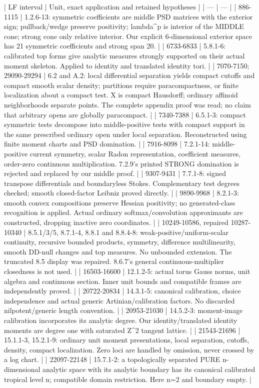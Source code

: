 \documentclass[11pt]{article}
\begin{document}
| LF interval | Unit, exact application and retained hypotheses |
| --- | --- |
| 886-1115 | 1.2.6-13: symmetric coefficients are middle PSD matrices with the exterior sign; pullback/wedge preserve positivity; lambda\textasciicircum{}p is interior of the MIDDLE cone; strong cone only relative interior. Our explicit 6-dimensional exterior space has 21 symmetric coefficients and strong span 20. |
| 6733-6833 | 5.8.1-6: calibrated top forms give analytic measures strongly supported on their actual moment skeleton. Applied to identity and translated identity tori. |
| 7070-7150; 29090-29294 | 6.2 and A.2: local differential separation yields compact cutoffs and compact smooth scalar density; partitions require paracompactness, or finite localization about a compact test. X is compact Hausdorff; ordinary affinoid neighborhoods separate points. The complete appendix proof was read; no claim that arbitrary opens are globally paracompact. |
| 7340-7388 | 6.5.1-3: compact symmetric tests decompose into middle-positive tests with compact support in the same prescribed ordinary open under local separation. Reconstructed using finite moment charts and PSD domination. |
| 7916-8098 | 7.2.1-14: middle-positive current symmetry, scalar Radon representation, coefficient measures, order-zero continuous multiplication. 7.2.9's printed STRONG domination is rejected and replaced by our middle proof. |
| 9307-9431 | 7.7.1-8: signed transpose differentials and boundaryless Stokes. Complementary test degrees checked; smooth closed-factor Leibniz proved directly. |
| 9890-9968 | 8.2.1-3: smooth convex compositions preserve Hessian positivity; no generated-class recognition is applied. Actual ordinary softmax/convolution approximants are constructed, dropping inactive zero coordinates. |
| 10249-10586, repaired 10287-10340 | 8.5.1/3/5, 8.7.1-4, 8.8.1 and 8.8.4-8: weak-positive/uniform-scalar continuity, recursive bounded products, symmetry, difference multilinearity, smooth DD-null changes and top measures. No unbounded extension. The truncated 8.5 display was repaired. 8.6.7's general continuous-multiplier closedness is not used. |
| 16503-16600 | 12.1.2-5: actual torus Gauss norms, unit algebra and continuous section. Inner unit bounds and compatible frames are independently proved. |
| 20722-20834 | 14.3.1-5: canonical calibration, choice independence and actual generic Artinian/calibration factors. No discarded nilpotent/generic length convention. |
| 20953-21030 | 14.5.2-3: moment-image calibration incorporates its analytic degree. Our identity/translated identity moments are degree one with saturated Z\textasciicircum{}2 tangent lattice. |
| 21543-21696 | 15.1.1-3, 15.2.1-9: ordinary unit moment presentations, local separation, cutoffs, density, compact localization. Zero loci are handled by omission, never crossed by a log chart. |
| 22097-22148 | 15.7.1-2: a topologically separated PURE n-dimensional analytic space with its analytic boundary has its canonical calibrated tropical level n; compatible domain restriction. Here n=2 and boundary empty. |
\end{document}
